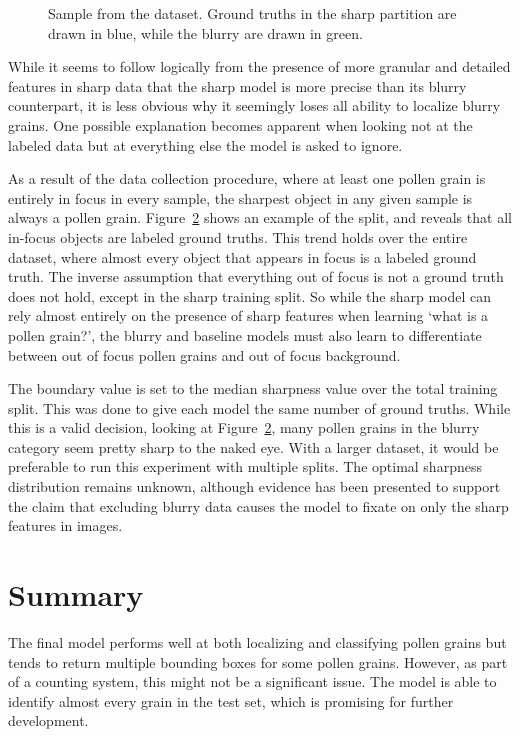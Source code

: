 \begin{figure}[htbp]
\begin{subfigure}[t]{0.35\textwidth}
    \label{fig:results-sharpness-blurry}
  \end{subfigure}
  \caption[Data sample showing split between sharp and blurry data]{%
Sample from the dataset. Ground truths in the sharp partition are drawn in \textcolor{poaceae}{blue}, while the blurry are drawn in \textcolor{alnus}{green}.
  }\label{fig:results-sharp-gt}
\end{figure}

While it seems to follow logically from the presence of more granular and detailed features in sharp data that the sharp model is more precise than its blurry counterpart, it is less obvious why it seemingly loses all ability to localize blurry grains.
One possible explanation becomes apparent when looking not at the labeled data but at everything else the model is asked to ignore.

As a result of the data collection procedure, where at least one pollen grain is entirely in focus in every sample, the sharpest object in any given sample is always a pollen grain.
Figure~\ref{fig:results-sharp-gt} shows an example of the split, and reveals that all in-focus objects are labeled ground truths.
This trend holds over the entire dataset, where almost every object that appears in focus is a labeled ground truth.
The inverse assumption that everything out of focus is not a ground truth does not hold, except in the sharp training split.
So while the sharp model can rely almost entirely on the presence of sharp features when learning `what is a pollen grain?', the blurry and baseline models must also learn to differentiate between out of focus pollen grains and out of focus background.

The boundary value is set to the median sharpness value over the total training split.
This was done to give each model the same number of ground truths.
While this is a valid decision, looking at Figure~\ref{fig:results-sharp-gt}, many pollen grains in the blurry category seem pretty sharp to the naked eye.
With a larger dataset, it would be preferable to run this experiment with multiple splits.
The optimal sharpness distribution remains unknown, although evidence has been presented to support the claim that excluding blurry data causes the model to fixate on only the sharp features in images.

\section{Summary}
The final model performs well at both localizing and classifying pollen grains but tends to return multiple bounding boxes for some pollen grains.
However, as part of a counting system, this might not be a significant issue.
The model is able to identify almost every grain in the test set, which is promising for further development.

